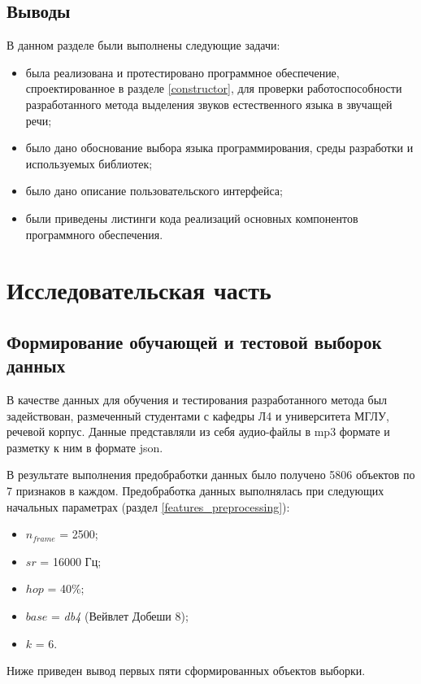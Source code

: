 \documentclass[utf8x, 14pt, oneside, a4paper]{article}
\begin{document}
	\subsection{Выводы}
	
	В данном разделе были выполнены следующие задачи:
	\begin{itemize}
		\item была реализована и протестировано программное обеспечение, спроектированное в разделе \ref{constructor}, для проверки работоспособности разработанного метода выделения звуков естественного языка в звучащей речи;
		\item было дано обоснование выбора языка программирования, среды разработки и используемых библиотек;
		\item было дано описание пользовательского интерфейса;
		\item были приведены листинги кода реализаций основных компонентов программного обеспечения.
	\end{itemize}
	\pagebreak
	
	\section{Исследовательская часть}
	
	\subsection{Формирование обучающей и тестовой выборок данных}
	
	В качестве данных для обучения и тестирования разработанного метода был задействован, размеченный студентами с кафедры Л4 и университета МГЛУ, речевой корпус. Данные представляли из себя аудио-файлы в mp3 формате и разметку к ним в формате json.
	
	В результате выполнения предобработки данных было получено 5806 объектов по 7 признаков в каждом. Предобработка данных выполнялась при следующих начальных параметрах (раздел \ref{features_preprocessing}):
	\begin{itemize}
		\item $n_{frame}$ = 2500;
		\item $sr$ = 16000 Гц;
		\item $hop$ = 40\%;
		\item $base$ = \textit{db4} (Вейвлет Добеши 8);
		\item $k$ = 6.
	\end{itemize}

	Ниже приведен вывод первых пяти сформированных объектов выборки.
	
\end{document}
